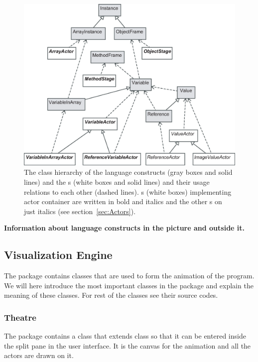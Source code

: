 \begin{figure}[!htb]
\begin{center}
\includegraphics[width=\textwidth]{images/language_constructs_and_actors.eps}
\caption{The class hierarchy of the language constructs (gray boxes and solid lines) and the s (white boxes and solid lines) and their usage relations to each other (dashed lines). s (white boxes) implementing actor container are written in bold and italics and the other s on just italics (see section~\ref{sec:Actors}).}
\label{fig:language_constructs_and_actors}
\end{center}
\end{figure}

{\bf Information about language constructs in the picture and outside it.}

\subsection{Visualization Engine}
\label{sec:Visualization_Engine}

The package  contains classes that are used to form the animation of the program. We will here introduce the most important classes in the package and explain the meaning of these classes. For rest of the classes see their source codes.

\subsubsection{Theatre}

The  package contains a class  that extends  class so that it can be entered inside the split pane in the user interface. It is the canvas for the animation and all the actors are drawn on it.

